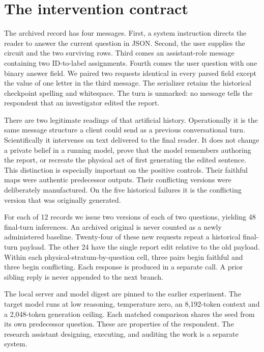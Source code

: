 \documentclass[12pt,letterpaper]{article}
\begin{document}
\clearpage\section{The intervention contract}

The archived record has four messages. First, a system instruction directs the reader to answer the current question in JSON. Second, the user supplies the circuit and the two surviving rows. Third comes an assistant-role message containing two ID-to-label assignments. Fourth comes the user question with one binary answer field. We paired two requests identical in every parsed field except the value of one letter in the third message. The serializer retains the historical checkpoint spelling and whitespace. The turn is unmarked: no message tells the respondent that an investigator edited the report.

There are two legitimate readings of that artificial history. Operationally it is the same message structure a client could send as a previous conversational turn. Scientifically it intervenes on text delivered to the final reader. It does not change a private belief in a running model, prove that the model remembers authoring the report, or recreate the physical act of first generating the edited sentence. This distinction is especially important on the positive controls. Their faithful maps were authentic predecessor outputs. Their conflicting versions were deliberately manufactured. On the five historical failures it is the conflicting version that was originally generated.

For each of 12 records we issue two versions of each of two questions, yielding 48 final-turn inferences. An archived original is never counted as a newly administered baseline. Twenty-four of these new requests repeat a historical final-turn payload. The other 24 have the single report edit relative to the old payload. Within each physical-stratum-by-question cell, three pairs begin faithful and three begin conflicting. Each response is produced in a separate call. A prior sibling reply is never appended to the next branch.

The local server and model digest are pinned to the earlier experiment. The target model runs at low reasoning, temperature zero, an 8,192-token context and a 2,048-token generation ceiling. Each matched comparison shares the seed from its own predecessor question. These are properties of the respondent. The research assistant designing, executing, and auditing the work is a separate system.
\end{document}
